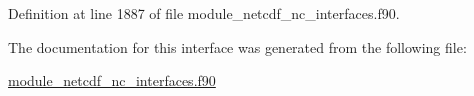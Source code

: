 Definition at line 1887 of file module\+\_\+netcdf\+\_\+nc\+\_\+interfaces.\+f90.



The documentation for this interface was generated from the following file\+:\begin{DoxyCompactItemize}
\item 
\hyperlink{module__netcdf__nc__interfaces_8f90}{module\+\_\+netcdf\+\_\+nc\+\_\+interfaces.\+f90}\end{DoxyCompactItemize}

